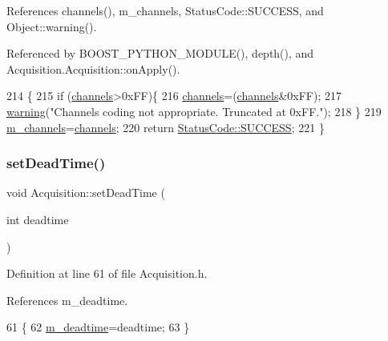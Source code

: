 References channels(), m\+\_\+channels, Status\+Code\+::\+S\+U\+C\+C\+E\+SS, and Object\+::warning().



Referenced by B\+O\+O\+S\+T\+\_\+\+P\+Y\+T\+H\+O\+N\+\_\+\+M\+O\+D\+U\+L\+E(), depth(), and Acquisition.\+Acquisition\+::on\+Apply().


\begin{DoxyCode}
214                                                          \{
215   \textcolor{keywordflow}{if} (\hyperlink{classAcquisition_a3041537afcb4dfe5c6940f0ef6829265}{channels}>0xFF)\{
216     \hyperlink{classAcquisition_a3041537afcb4dfe5c6940f0ef6829265}{channels}=(\hyperlink{classAcquisition_a3041537afcb4dfe5c6940f0ef6829265}{channels}&0xFF);
217     \hyperlink{classObject_a65cd4fda577711660821fd2cd5a3b4c9}{warning}(\textcolor{stringliteral}{"Channels coding not appropriate. Truncated at 0xFF."});
218   \}
219   \hyperlink{classAcquisition_aedc8b29f322ef00540797fbd0d5112d1}{m\_channels}=\hyperlink{classAcquisition_a3041537afcb4dfe5c6940f0ef6829265}{channels};
220   \textcolor{keywordflow}{return} \hyperlink{classStatusCode_a6f565cbeadc76d14c72f047e5e85eb4badd0da38d3ba0d922efd1f4619bc37ad8}{StatusCode::SUCCESS};
221 \}
\end{DoxyCode}
\mbox{\label{classAcquisition_a37e05315fc47958c290a7d938c61e067}} 
\subsubsection{\texorpdfstring{set\+Dead\+Time()}{setDeadTime()}\hspace{0.1cm}{\footnotesize\ttfamily [1/2]}}
{\footnotesize\ttfamily void Acquisition\+::set\+Dead\+Time (\begin{DoxyParamCaption}\item[{int}]{deadtime }\end{DoxyParamCaption})\hspace{0.3cm}{\ttfamily [inline]}}



Definition at line 61 of file Acquisition.\+h.



References m\+\_\+deadtime.


\begin{DoxyCode}
61                                 \{
62     \hyperlink{classAcquisition_a5f7fe20506e7d860ed61935255adfe17}{m\_deadtime}=deadtime;
63   \}
\end{DoxyCode}
\mbox{\label{classAcquisition_a37e05315fc47958c290a7d938c61e067}} 
